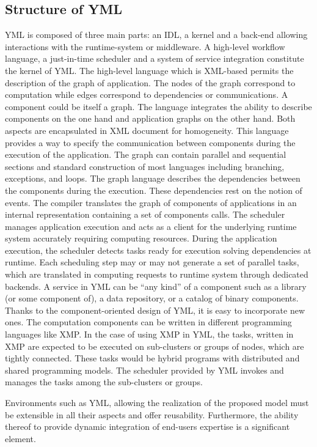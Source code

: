 \subsection{Structure of YML}

YML is composed of three main parts: an IDL, a kernel and a back-end allowing interactions with the runtime-system or middleware. A high-level workflow language, a just-in-time scheduler and a system of service integration constitute the kernel of YML. The high-level language which is XML-based permits the description of the graph of application. The nodes of the graph correspond to computation while edges correspond to dependencies or communications. A component could be itself a graph. The language integrates the ability to describe components on the one hand and application graphs on the other hand. Both aspects are encapsulated in XML document for homogeneity. This language provides a way to specify the communication between components during the execution of the application. The graph can contain parallel and sequential sections and standard construction of most languages including branching, exceptions, and loops. The graph language describes the dependencies between the components during the execution. These dependencies rest on the notion of events. The compiler translates the graph of components of applications in an internal representation containing a set of components calls. The scheduler manages application execution and acts as a client for the underlying runtime system accurately requiring computing resources. During the application execution, the scheduler detects tasks ready for execution solving dependencies at runtime. Each scheduling step may or may not generate a set of parallel tasks, which are translated in computing requests to runtime system through dedicated backends. A service in YML can be “any kind” of a component such as a library (or some component of), a data repository, or a catalog of binary components. Thanks to the component-oriented design of YML, it is easy to incorporate new ones. The computation components can be written in different programming languages like XMP. In the case of using XMP in YML, the tasks, written in XMP are expected to be executed on sub-clusters or groups of nodes, which are tightly connected. These tasks would be hybrid programs with distributed and shared programming models. The scheduler provided by YML invokes and manages the tasks among the sub-clusters or
groups.

Environments such as YML, allowing the realization of the proposed model must be extensible in all their aspects and offer reusability. Furthermore, the ability thereof to provide dynamic integration of end-users expertise is a significant element.

